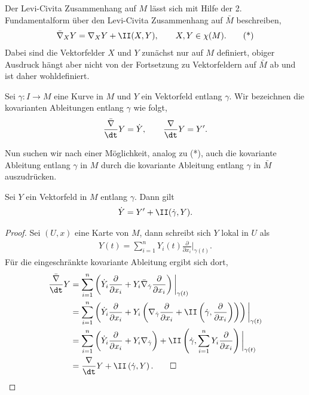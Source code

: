 \documentclass[%
	paper=a5,%
	fleqn,%
	DIV=18,%
	BCOR=0mm,
	fontsize=11pt,
	titlepage=false,%
	bibliography=totoc,
	DIV=18,%
	twoside=true,
	pdftitle=Riemannsche Geometrie,
	pdfauthor=Uwe Semmelmann,
	numbers=noendperiod]%
	{scrbook}
\begin{document}
Der Levi-Civita Zusammenhang auf $M$ lässt sich mit Hilfe der 2. Fundamentalform über den Levi-Civita Zusammenhang auf $\bar{M}$ beschreiben,
\begin{align*}
\bar{\nabla}_{X}Y = \nabla_{X}Y + \II(X,Y),\qquad X,Y\in \chi(M).\tag{*}
\end{align*}
Dabei sind die Vektorfelder $X$ und $Y$ zunächst nur auf $M$ definiert, obiger Ausdruck hängt aber nicht von der Fortsetzung zu Vektorfeldern auf $\bar{M}$ ab und ist daher wohldefiniert.

Sei $\gamma: I\to M$ eine Kurve in $M$ und $Y$ ein Vektorfeld entlang $\gamma$. Wir bezeichnen die kovarianten Ableitungen entlang $\gamma$ wie folgt,
\begin{align*}
\frac{\bar{\nabla}}{\dt} Y = \dot{Y},\qquad
\frac{\nabla}{\dt} Y = Y'.
\end{align*}

Nun suchen wir nach einer Möglichkeit, analog zu (*), auch die kovariante Ableitung entlang $\gamma$  in $M$ durch die kovariante Ableitung entlang $\gamma$ in $\bar{M}$ auszudrücken.

\begin{lem}
Sei $Y$ ein Vektorfeld in $M$ entlang $\gamma$. Dann gilt
\begin{align*}
\dot{Y} = Y' + \II(\dot{\gamma},Y).
\end{align*}
\end{lem}
\begin{proof}
Sei $(U,x)$ eine Karte von $M$, dann schreibt sich $Y$ lokal in $U$ als
\begin{align*}
Y(t) = \sum_{i=1}^n Y_{i}(t) \frac{\partial}{\partial x_{i}}\bigg|_{\gamma(t)}.
\end{align*}
Für die eingeschränkte kovariante Ableitung ergibt sich dort,
\begin{align*}
\frac{\bar{\nabla}}{\dt} Y &= 
\sum_{i=1}^n \left( \dot{Y}_{i}\frac{\partial}{\partial x_{i}}
+
Y_{i} \bar{\nabla}_{\dot{\gamma}} \frac{\partial}{\partial x_{i}}\right)\bigg|_{\gamma(t)}\\
&= 
\sum_{i=1}^n \left( \dot{Y}_{i}\frac{\partial}{\partial x_{i}}
+
Y_{i} \left(\nabla_{\dot{\gamma}} \frac{\partial}{\partial x_{i}} + \II\left(\dot{\gamma},\frac{\partial}{\partial x_{i}}\right)\right)\right)\bigg|_{\gamma(t)}\\
&= 
\sum_{i=1}^n \left( \dot{Y}_{i}\frac{\partial}{\partial x_{i}}
+
Y_{i} \nabla_{\dot{\gamma}}\right) + \II \left(\dot{\gamma},\sum_{i=1}^n Y_{i}\frac{\partial}{\partial x_{i}}\right)\bigg|_{\gamma(t)}\\
&= 
\frac{\nabla}{\dt}Y + \II \left(\dot{\gamma},Y\right).\qed
\end{align*}
\end{proof}
\end{document}
